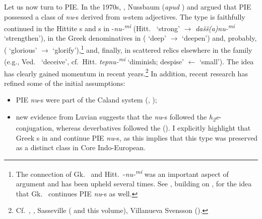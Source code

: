 \documentclass[output=paper,colorlinks,citecolor=brown]{langscibook}
\begin{document}
Let us now turn to PIE. In the 1970s, \citet{Koch1973}, Nussbaum (\textit{apud} \citealt[26]{Tucker1981}) and \citet{Tucker1981} argued that PIE possessed a class of \textit{nu}-s derived from \textit{u}-stem adjectives. The type is faithfully continued in the Hittite s and s in -\textit{nu-\textsuperscript{mi}} (Hitt.\  ‘strong’ $\rightarrow$ \textit{dašš(a)nu-\textsuperscript{mi}} ‘strengthen’), in the Greek denominatives  in  ( ‘deep’ $\rightarrow$  ‘deepen’) and, probably,  ( ‘glorious’ $\rightarrow$  ‘glorify’),\footnote{The connection of Gk.\  and Hitt.\ {-\textit{nu-\textsuperscript{mi}}} was an important aspect of  argument and has been upheld several times. See \citet{VillanuevaSvensson2024}, building on \citet[22--29]{Tucker1981}, for the idea that Gk.\  continues PIE \textit{nu}-s as well.} and, finally, in scattered relics elsewhere in the family (e.g., Ved.\  ‘deceive’, cf.\ Hitt. \textit{tepnu-\textsuperscript{mi}}  ‘diminish; despise’ $\leftarrow$  ‘small’). The idea has clearly gained momentum in recent years.\footnote{Cf.\ \citet[206--210]{Steer2013NIP}, \citet{Oettinger2018}, Sasseville (\citeyear[484--486]{Sasseville2021} and this volume), Villanueva Svensson (\citeyear{VillanuevaSvensson2024, VillanuevaSvenssonforth}).} In addition, recent research has refined some of the initial assumptions:

\begin{itemize}
    \item PIE \textit{nu}-s were part of the Caland system  (\citealt[112--120]{Rau2009}, \citealt{Oettinger2018});
    \item new evidence from Luvian suggests that the \textit{nu}-s followed the \textit{h\textsubscript{2}}\textit{e}-conjugation, whereas deverbatives followed the  (\citealt[485--486]{Sasseville2021}). I explicitly highlight that Greek s in  and  continue PIE \textit{nu}-s, as this implies that this type was preserved as a distinct class in Core Indo-European.
\end{itemize}
\end{document}
